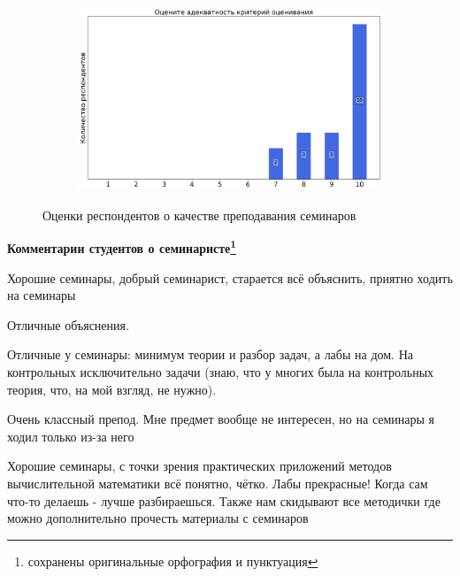 \begin{figure}[H]
\begin{subfigure}[b]{0.45\textwidth}
			\end{subfigure}
			\begin{subfigure}[b]{0.45\textwidth}
				\centering
				\includegraphics[width=\textwidth]{images/3 course/Вычислительная математика/seminarists-marks-Кожемяченко А.А.-3.png}
			\end{subfigure}	
			\caption{Оценки респондентов о качестве преподавания семинаров}
		\end{figure}


		\textbf{Комментарии студентов о семинаристе\protect\footnote{сохранены оригинальные орфография и пунктуация}}
            \begin{commentbox} 
                Хорошие семинары, добрый семинарист, старается всё объяснить, приятно ходить на семинары 
            \end{commentbox} 

            \begin{commentbox} 
                Отличные объяснения. 
            \end{commentbox} 
        
            \begin{commentbox} 
                Отличные у семинары: минимум теории и разбор задач, а лабы на дом. На контрольных исключительно задачи (знаю, что у многих была на контрольных теория, что, на мой взгляд, не нужно). 
            \end{commentbox} 
        
            \begin{commentbox} 
                Очень классный препод. Мне предмет вообще не интересен, но на семинары я ходил только из-за него 
            \end{commentbox} 
        
            \begin{commentbox} 
                Хорошие семинары, с точки зрения практических приложений методов вычислительной математики всё понятно, чётко. Лабы прекрасные! Когда сам что-то делаешь - лучше разбираешься. Также нам скидывают все методички где можно дополнительно прочесть материалы с семинаров 
            \end{commentbox} 
        
